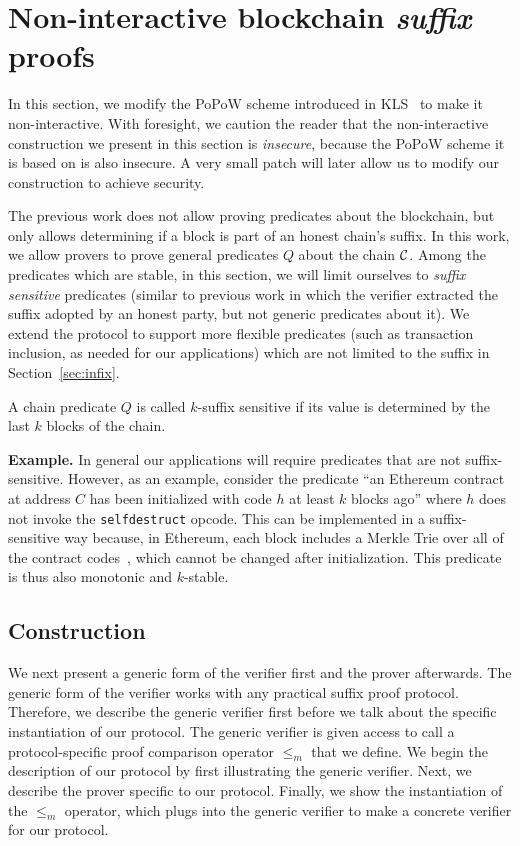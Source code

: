 \section{Non-interactive blockchain \emph{suffix} proofs}
In this section, we modify the PoPoW scheme introduced in KLS~\cite{KLS} to make
it non-interactive. With foresight, we caution the reader that the
non-interactive construction we present in this section is \emph{insecure},
because the PoPoW scheme it is based on is also insecure. A very small patch
will later allow us to modify our construction to achieve security.

The previous work does not allow proving predicates about the blockchain, but
only allows determining if a block is part of an honest chain's suffix. In this
work, we allow provers to prove general predicates $Q$ about the chain $\mathcal{C}$.
Among the predicates which are stable, in this section, we will limit ourselves
to \textit{suffix sensitive} predicates (similar to previous work in which the
verifier extracted the suffix adopted by an honest party, but not generic
predicates about it). We extend the protocol to support more flexible predicates
(such as transaction inclusion, as needed for our applications) which are not
limited to the suffix in Section~\ref{sec:infix}.

\begin{definition}
A chain predicate $Q$ is called $k$-\textnormal{suffix sensitive} if its value
is determined by the last $k$ blocks of the chain.
\end{definition}

\noindent\textbf{Example.}
In general our applications will require predicates that are not
suffix-sensitive. However, as an example, consider the predicate ``an Ethereum
contract at address $C$ has been initialized with code $h$ at least $k$ blocks
ago'' where $h$ does not invoke the \texttt{selfdestruct} opcode. This can be
implemented in a suffix-sensitive way because, in Ethereum, each block includes
a Merkle Trie over all of the contract codes~\cite{vitalik,wood}, which cannot be
changed after initialization. This predicate is thus also monotonic and
$k$-stable.

\subsection{Construction}
We next present a generic form of the verifier first and the prover afterwards.
The generic form of the verifier works with any practical suffix proof protocol.
Therefore, we describe the generic verifier first before we talk about the
specific instantiation of our protocol. The generic verifier is given access to
call a protocol-specific proof comparison operator $\leq_m$ that we define. We
begin the description of our protocol by first illustrating the generic
verifier. Next, we describe the prover specific to our protocol. Finally, we
show the instantiation of the $\leq_m$ operator, which plugs into the generic
verifier to make a concrete verifier for our protocol.

